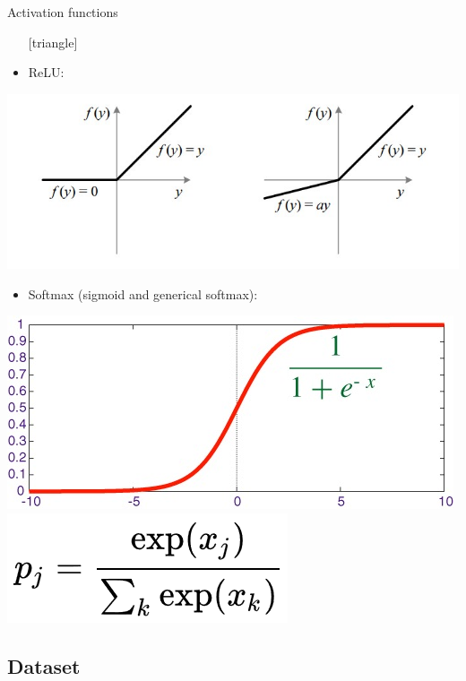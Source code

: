 \documentclass{beamer}
\begin{document}
\begin{frame}{Activation functions}
	\begin{itemize}
		\setlength\itemsep{1em}
		[triangle]
		\item 
			ReLU:
	\end{itemize}
	\begin{center}
		\includegraphics[scale=0.30]{ReLU}
	\end{center}
	\begin{itemize}
		\setlength\itemsep{1em}
		[triangle]
		\item 
			Softmax (sigmoid and generical softmax):
	\end{itemize}
	\begin{center}
		\includegraphics[scale=0.25]{softmax1}
		\includegraphics[scale=0.6]{softm}
	\end{center}
\end{frame}

\subsection{Dataset}
\end{document}
